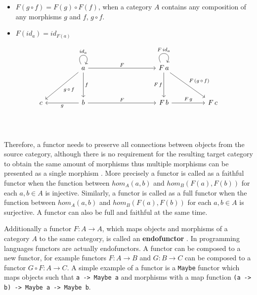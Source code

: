 \documentclass[article]{aaltoseries}
\begin{document}
    \begin{itemize}
      \item $F(g \circ f) = F(g) \circ F(f)$, when a category $A$ contains any
        composition of any morphisms $g$ and $f$, $g \circ f$.
      \item $F(id_a) = id_{F(a)}$
    \end{itemize}

    \[
      \begin{tikzcd}[row sep=huge, column sep=huge]
        & a \arrow[d, "f"] \arrow[dl, "g\, \circ\, f"] \arrow[r, "F"] \arrow[loop, distance=2em, in=60, out=120, "id_a"]
        &[5em] F\, a \arrow[d, "F\, f"'] \arrow[dr, "F\, (g\, \circ\, f)"]
                   \arrow[loop, distance=2em, in=60, out=120, "F\, id_a"]
        & \\
        c
        & b \arrow[l, "g"] \arrow[r, "F"]
        & F\, b \arrow[r, "F\, g"]
        & F\, c \\
      \end{tikzcd}
    \]

    Therefore, a functor needs to preserve all connections between objects from
    the source category, although there is no requirement for the resulting
    target category to obtain the same amount of morphisms thus multiple
    morphisms can be presented as a single morphism \cite{computational,
      barr1990category}. More precisely a functor is called as a faithful
    functor when the function between $hom_A(a, b)$ and $hom_B(F(a), F(b))$ for
    each $a, b \in A$ is injective. Similarly, a functor is called as a full
    functor when the function between $hom_A(a, b)$ and $hom_B(F(a), F(b))$ for
    each $a, b \in A$ is surjective. A functor can also be full and faithful at
    the same time.
 
    Additionally a functor $F: A \rightarrow A$, which maps objects and
    morphisms of a category $A$ to the same category, is called an
    \textbf{endofunctor} \cite{computational, barr1990category}. In programming
    languages functors are actually endofunctors. A functor can be composed to a
    new functor, for example functors $F: A \rightarrow B$ and $G: B \rightarrow
    C$ can be composed to a functor $G \circ F: A \rightarrow C$. A simple
    example of a functor is a \lstinline|Maybe| functor which maps objects such
    that \lstinline|a -> Maybe a| and morphisms with a map function
    \lstinline|(a -> b) -> Maybe a -> Maybe b|.

\end{document}
